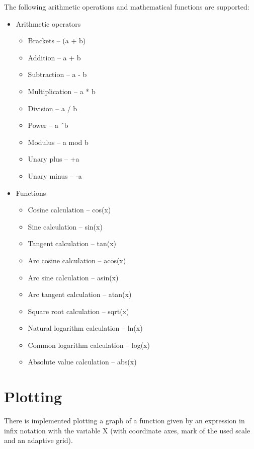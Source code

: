 \documentclass{article}
\begin{document}
The following arithmetic operations and mathematical functions are supported:
  \begin{itemize}
    \item Arithmetic operators
    \begin{itemize}
      \item Brackets -- (a + b)
      \item Addition -- a + b
      \item Subtraction -- a - b
      \item Multiplication -- a * b
      \item Division -- a / b
      \item Power -- a \^\ b
      \item Modulus -- a mod b
      \item Unary plus -- +a
      \item Unary minus -- -a
    \end{itemize}
    \item Functions
    \begin{itemize}
      \item Cosine calculation -- cos(x)
      \item Sine calculation -- sin(x)
      \item Tangent calculation -- tan(x)
      \item Arc cosine calculation -- acos(x)
      \item Arc sine calculation -- asin(x)
      \item Arc tangent calculation -- atan(x)
      \item Square root calculation -- sqrt(x)
      \item Natural logarithm calculation -- ln(x)
      \item Common logarithm calculation -- log(x)
      \item Absolute value calculation -- abs(x)
    \end{itemize}
  \end{itemize}

\section{Plotting}

There is implemented plotting a graph of a function given by an expression in infix notation with the variable X (with coordinate axes, mark of the used scale and an adaptive grid).
  
\end{document}
